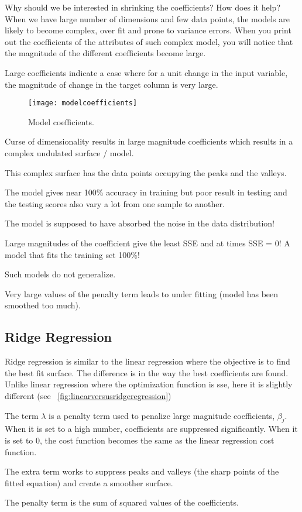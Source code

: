 Why should we be interested in shrinking the coefficients? How does it help?  When we have large number of dimensions and few data points, the models are likely to become complex, over fit and prone to variance errors. When you print out the coefficients of the attributes of such complex model, you will notice that the magnitude of the different coefficients become large.

Large coefficients indicate a case where for a unit change in the input variable, the magnitude of change in the target column is very large.

	\begin{figure}[tbh]
		\centering
		\texttt{[image: modelcoefficients]}
		\caption{Model coefficients.}
		\label{fig:modelcoefficients}
	\end{figure}

	\begin{bulletedlist}
		\item Curse of dimensionality results in large magnitude coefficients which results in a complex undulated surface / model.
		\item This complex surface has the data points occupying the peaks and the valleys.
		\item The model gives near 100\% accuracy in training but poor result in testing and the testing scores also vary a lot from one sample to another.
		\item The model is supposed to have absorbed the noise in the data distribution!
		\item Large magnitudes of the coefficient give the least SSE and at times SSE = 0! A model that fits the training set 100\%!
		\item Such models do not generalize.
		\item Very large values of the penalty term leads to under fitting (model has been smoothed too much).
	\end{bulletedlist}

	\subsection{Ridge Regression}
	\begin{bulletedlist}
		\item Ridge regression is similar to the linear regression where the objective is to find the best fit surface. The difference is in the way the best coefficients are found. Unlike linear regression where the optimization function is \gls{sse}, here it is slightly different (see \figurename~\ref{fig:linearversusridgeregression})
		\item The term $\lambda$ is a penalty term used to penalize large magnitude coefficients, $\beta_j$.  When it is set to a high number, coefficients are suppressed significantly.  When it is set to 0, the cost function becomes the same as the linear regression cost function.
		\item The extra term works to suppress peaks and valleys (the sharp points of the fitted equation) and create a smoother surface.
		\item The penalty term is the sum of squared values of the coefficients.
	\end{bulletedlist}

